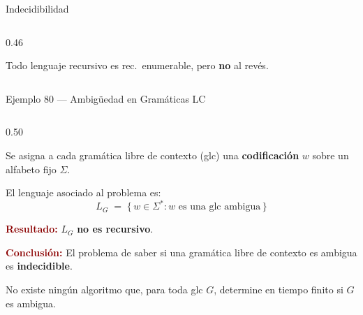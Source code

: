 \documentclass[aspectratio=1610, 12pt]{beamer}
\begin{document}
\begin{frame}[t]{Indecidibilidad}
\begin{columns}[T]
\begin{column}{0.46\textwidth}
\begin{defbox}
\begin{center}
      \end{center}
      \vspace{2pt}
      \scriptsize 
      Todo lenguaje recursivo es rec.\ enumerable,
      pero \textbf{no} al revés.
    \end{defbox}
  \end{column}

\end{columns}
\end{frame}


\begin{frame}[t]{Ejemplo 80 — Ambigüedad en Gramáticas LC}
\vspace{4pt}
\begin{columns}[T]

  \begin{column}{0.50\textwidth}
    \begin{exbox}[Planteamiento]
      \footnotesize
      Se asigna a cada gramática libre de contexto (glc)
      una \textbf{codificación} $w$ sobre un alfabeto fijo $\Sigma$.

      \vspace{4pt}
      El lenguaje asociado al problema es:
      \[
        L_G \;=\; \{\,w \in \Sigma^* : w \text{ es una glc ambigua}\,\}
      \]

      \vspace{2pt}
      \textcolor{DarkRed}{\textbf{Resultado:}} $L_G$ \textbf{no es recursivo}.
    \end{exbox}

    \vspace{2pt}
    \begin{alertbox}
      \footnotesize %
      \textcolor{DarkRed}{\textbf{Conclusión:}}
      El problema de saber si una gramática libre de contexto
      es ambigua es \textbf{indecidible}.

      \vspace{3pt}
      No existe ningún algoritmo que, para toda glc $G$,
      determine en tiempo finito si $G$ es ambigua.
    \end{alertbox}
  \end{column}


\end{columns}
\end{frame}
\end{document}
